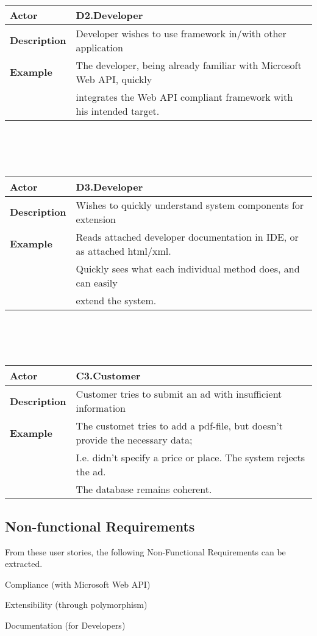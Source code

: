 \documentclass[12pt, a4paper]{article}
\begin{document}
\\\\\\
\begin{tabular}{| l | l |}
	\hline
	\textbf{Actor} & D2.Developer \\
	\hline
	\textbf{Description} & Developer wishes to use framework in/with other application \\
	\hline
	\textbf{Example} & The developer, being already familiar with Microsoft Web API, quickly \\
	& integrates the Web API compliant framework with his intended target.\\
	\hline
	
\end{tabular}
\\\\\\
\begin{tabular}{| l | l |}
	\hline
	\textbf{Actor} & D3.Developer \\
	\hline
	\textbf{Description} & Wishes to quickly understand system components for extension \\
	\hline
	\textbf{Example} & Reads attached developer documentation in IDE, or as attached html/xml.\\
	& Quickly sees what each individual method does, and can easily \\
	& extend the system.\\
	\hline
	
\end{tabular}
\\\\\\
\begin{tabular}{| l | l |}
	\hline
	\textbf{Actor} & C3.Customer \\
	\hline
	\textbf{Description} & Customer tries to submit an ad with insufficient information \\
	\hline
	\textbf{Example} & The customet tries to add a pdf-file, but doesn't provide the necessary data;\\
	& I.e. didn't specify a price or place. The system rejects the ad.\\
	& The database remains coherent.\\
	\hline
	
\end{tabular}

\subsection{Non-functional Requirements}

From these user stories, the following Non-Functional Requirements can be extracted. 

\itemize
\item Compliance (with Microsoft Web API)
\item Extensibility (through polymorphism)
\item Documentation (for Developers)
\end{document}
